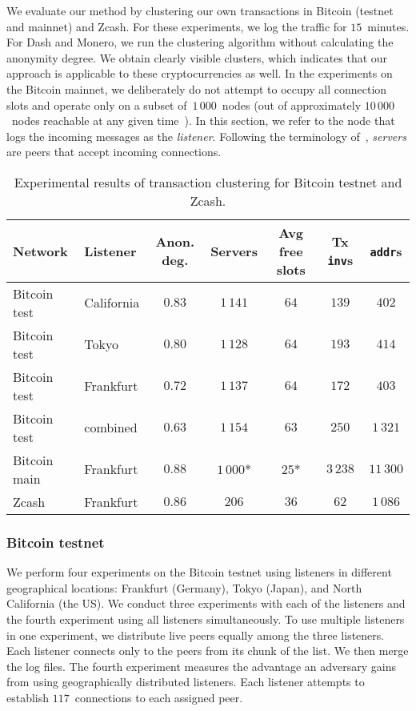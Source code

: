 We evaluate our method by clustering our own transactions in Bitcoin (testnet and mainnet) and Zcash.
For these experiments, we log the traffic for $15$~minutes.
For Dash and Monero, we run the clustering algorithm without calculating the anonymity degree.
We obtain clearly visible clusters, which indicates that our approach is applicable to these cryptocurrencies as well.
In the experiments on the Bitcoin mainnet, we deliberately do not attempt to occupy all connection slots and operate only on a subset of~$1\,000$~nodes (out of approximately $10\,000$~nodes reachable at any given time~\cite{Bitnodes}).
In this section, we refer to the node that logs the incoming messages as the \textit{listener}.
Following the terminology of~\cite{Biryukov2014}, \textit{servers} are peers that accept incoming connections.

\begin{table*}[!t]
	\normalsize
	\caption{Experimental results of transaction clustering for Bitcoin testnet and Zcash.}
	\centering
	\begin{tabular}{|l|l|c|c|c|c|c|}
		\hline
		Network & Listener & Anon\@. deg. & Servers & Avg free slots & Tx \texttt{inv}s & \texttt{addr}s \\
		\hline
		Bitcoin test & California & $0.83$ & $1\,141$ & $64$ & $139$ & $402$ \\
		Bitcoin test & Tokyo & $0.80$ & $1\,128$ & $64$ & $193$ & $414$ \\
		Bitcoin test & Frankfurt & $0.72$ & $1\,137$ & $64$ & $172$ & $403$ \\
		Bitcoin test & combined & $0.63$ & $1\,154$ & $63$ & $250$ & $1\,321$ \\
		Bitcoin main & Frankfurt & $0.88$ & $1\,000$* & $25$* & $3\,238$ & $11\,300$ \\
		Zcash & Frankfurt & $0.86$ & $206$ & $36$ & $62$ & $1\,086$ \\
		\hline
	\end{tabular}
	\label{tab:results}
\end{table*}

\subsubsection{Bitcoin testnet}

We perform four experiments on the Bitcoin testnet using listeners in different geographical locations: Frankfurt (Germany), Tokyo (Japan), and North California (the US).
We conduct three experiments with each of the listeners and the fourth experiment using all listeners simultaneously.
To use multiple listeners in one experiment, we distribute live peers equally among the three listeners.
Each listener connects only to the peers from its chunk of the list.
We then merge the log files.
The fourth experiment measures the advantage an adversary gains from using geographically distributed listeners.
Each listener attempts to establish $117$~connections to each assigned peer.

